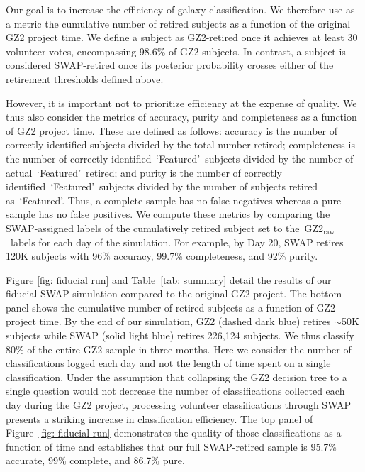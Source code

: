 \documentclass[twocolumn]{aastex6}%
\newcommand{\feat}{`Featured'}
\newcommand{\raw}{GZ2$_{\text{raw}}$}
\begin{document}
Our goal is to increase the efficiency of galaxy classification. We therefore
 use as a metric the cumulative number of retired subjects
as a function of the original GZ2 project time.
We define a subject as GZ2-retired once it achieves at least 30 volunteer votes, 
encompassing 98.6\% of GZ2 subjects.
In contrast, a subject is considered SWAP-retired once its posterior 
probability crosses either of the retirement thresholds defined above. 


However, it is important not to prioritize efficiency at the expense of quality. 
We thus also consider the metrics of accuracy, 
purity and completeness as a function of GZ2 project time.  
These are defined as follows: accuracy is the number of correctly
identified subjects divided by the total number retired; completeness is the number of 
correctly identified~\feat~subjects divided by the number of actual~\feat~retired; 
and purity is the number of correctly identified~\feat~subjects divided by 
the number of subjects retired as~\feat. Thus, a complete sample has no false
negatives whereas a pure sample has no false positives. 
We compute these metrics by comparing the SWAP-assigned labels of the cumulatively 
retired subject set to the~\raw~labels for each day of the simulation. 
For example, by Day 20, SWAP retires 120K subjects with 96\% accuracy,
 99.7\% completeness, and 92\% purity. 

Figure \ref{fig: fiducial run} and Table~\ref{tab: summary} detail the results of 
our fiducial SWAP simulation compared to the original GZ2 project. 
The bottom panel shows the cumulative number of retired subjects as a function of 
GZ2 project time. By the end of our simulation, GZ2 (dashed dark blue)
 retires $\sim$50K subjects while SWAP (solid light blue) retires 226,124 subjects.  
We thus classify 80\% of the entire GZ2 sample in three months. 
{Here we consider the number of classifications logged each day and not the length of time spent on a single classification.  Under the assumption that collapsing the GZ2 decision tree to a single question would not decrease the number of classifications collected each day during the GZ2 project, processing volunteer classifications through SWAP presents a striking increase in classification efficiency.}
The top panel of Figure~\ref{fig: fiducial run} demonstrates the quality of 
those classifications as a function of time and establishes that our full 
SWAP-retired sample is 95.7\% accurate, 99\% complete, and 86.7\% pure. 
\end{document}
